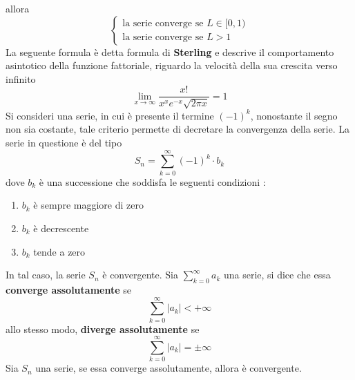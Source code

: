 \documentclass[10pt, letterpaper]{report}
\begin{document}
allora $$\begin{cases}
   \text{la serie converge se } L\in [0,1)\\
   \text{la serie converge se } L>1
\end{cases}
 $$
 La seguente formula è detta formula di \textbf{Sterling} e descrive 
 il comportamento asintotico della funzione fattoriale, riguardo la velocità 
 della sua crescita verso infinito 
 $$ 
 \lim_{x\rightarrow \infty} \dfrac{x!}{x^xe^{-x}\sqrt{2\pi x}}=1
 $$
  Si consideri una serie, in cui è presente 
 il termine $(-1)^k$, nonostante il segno non sia costante, tale criterio permette 
 di decretare la convergenza della serie. La serie in questione è del tipo 
 $$ S_n=\sum_{k=0}^\infty (-1)^k\cdot b_k$$
dove $b_k$ è una successione che soddisfa le seguenti condizioni : \begin{enumerate}
    \item $b_k$ è sempre maggiore di zero
    \item $b_k$ è decrescente
    \item $b_k$ tende a zero
\end{enumerate}
In tal caso, la serie $S_n$ è convergente.\acc 
Sia $\sum_{k=0}^\infty a_k$ una serie, si dice che essa 
\textbf{converge assolutamente} se 
$$ \sum_{k=0}^\infty |a_k|<+\infty$$
allo stesso modo, \textbf{diverge assolutamente} se 
$$ \sum_{k=0}^\infty |a_k|=\pm\infty$$
\teo{}Sia $S_n$ una serie, se essa converge assolutamente, allora è convergente. 
 \newpage 
\end{document}

